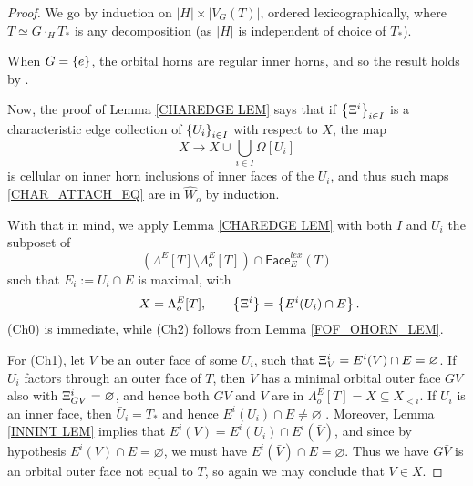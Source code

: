 \documentclass[a4paper,10pt,draft]{article}%
\begin{document}
\begin{proof}
      We go by induction on $|H| \times |V_G(T)|$, ordered lexicographically,
      where $T \simeq G \cdot_H T_*$ is any decomposition
      (as $|H|$ is independent of choice of $T_*$).
      
      When $G = \left\{e\right\}$, the orbital horns are regular inner horns, and so the result holds by \cite[Proposition 6.17]{Per17}.

      Now, the proof of Lemma \ref{CHAREDGE LEM} says that
      if $\left\{\Xi^i\right\}_{i \in I}$ is a characteristic edge collection of $\left\{U_i\right\}_{i \in I}$ with respect to $X$,
      the map
      \begin{equation}
            \label{CHAR_ATTACH_EQ}
            X \to X \cup \mathop{\bigcup}\limits_{i \in I} \Omega[U_i]
      \end{equation}
      is cellular on inner horn inclusions of inner faces of the $U_i$,
      and thus such maps \eqref{CHAR_ATTACH_EQ} are in $\hat{W}_o$ by induction.

      With that in mind, we apply Lemma \ref{CHAREDGE LEM} with
      both $I$ and ${U_i}$ the
      subposet of       
      \begin{equation}
            (\Lambda^{E}[T] \setminus \Lambda^{E}_o[T]) \cap \mathsf{Face}^{lex}_{E}(T)
      \end{equation}
      such that $E_i := U_i \cap E$ is maximal,
      with
      \begin{equation}
            \qquad X = \Lambda^{E}_o[T],
            \qquad \left\{\Xi^i\right\} = \left\{E^i(U_i) \cap E\right\}.
      \end{equation}
      (Ch0) is immediate,
      while (Ch2) follows from Lemma \ref{FOF_OHORN_LEM}.
      
      For (Ch1),      
      let $V$ be an outer face of some $U_i$, such that $\Xi^i_V = E^i(V) \cap E = \varnothing$.      
      If $U_i$ factors through an outer face of $T$,
      then $V$ has a minimal orbital outer face $G V$ also with $\Xi^i_{G V} = \varnothing$, %
      and hence both $G V$ and $V$ are in $\Lambda^E_o[T] = X \subseteq X_{< i}$.
      If $U_i$ is an inner face,
      then $\bar U_i = T_*$ and hence $E^i(U_i) \cap E \neq \varnothing$ . 
      Moreover, Lemma \ref{INNINT LEM} implies that $E^i(V) = E^i(U_i) \cap E^i(\bar V)$, and 
      since by hypothesis $E^i(V) \cap E = \varnothing$,
      we must have $E^i(\bar V) \cap E = \varnothing$.
      Thus we have $G \bar V$ is an orbital outer face not equal to $T$,
      so again we may conclude that $V \in X$.
      

\end{proof}
\end{document}
